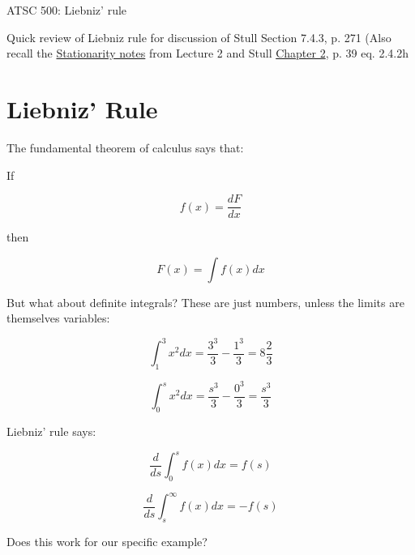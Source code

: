\documentclass[12pt]{article}
\begin{document}
\pagestyle{first}

\begin{center}
ATSC 500:  Liebniz' rule\\
\end{center}

Quick review of Liebniz rule for discussion of Stull Section 7.4.3, p. 271
(Also recall the
\href{http://clouds.eos.ubc.ca/~phil/courses/atsc500/docs/stationarity.pdf}{Stationarity notes} from Lecture 2 and Stull 
\href{http://clouds.eos.ubc.ca/~phil/courses/atsc500/docs/readings/chap2.pdf}{Chapter 2}, p. 39 eq. 2.4.2h


\section{Liebniz' Rule}
\label{sec:liebniz}

The fundamental theorem of calculus says that:

If 

\begin{equation}
  \label{eq:fund}
  f(x) = \frac{dF}{dx}
\end{equation}

then

\begin{equation}
  \label{eq:fund2}
  F(x) = \int f(x) dx
\end{equation}

But what about definite integrals?  These are just numbers, unless the limits are themselves variables:

\begin{equation}
  \label{eq:examp1}
  \int_1^3 x^2 dx = \frac{3^3}{3} - \frac{1^3}{3} = 8 \frac{2}{3}
\end{equation}

\begin{equation}
  \label{eq:examp2}
  \int_0^s x^2 dx = \frac{s^3}{3} - \frac{0^3}{3} = \frac{s^3}{3}
\end{equation}

Liebniz' rule says:

\begin{equation}
  \label{eq:lieb1}
  \frac{d}{ds} \int_0^s f(x) dx = f(s)
\end{equation}

\begin{equation}
  \label{eq:lieb2}
  \frac{d}{ds} \int_s^\infty f(x) dx = -f(s)
\end{equation}

Does this work for our specific example?
\end{document}
